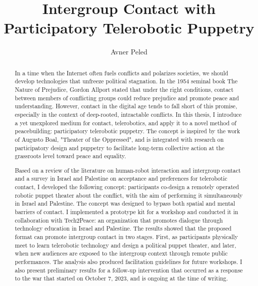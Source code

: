 \documentclass[dissertation,math,vertlayout,pdfa,colorlinks,nologo]{aaltoseries}
\author{Avner Peled}
\title{Intergroup Contact with Participatory Telerobotic Puppetry}
\begin{document}
\draftabstract{
}%


\begin{abstract}
In a time when the Internet often fuels conflicts and polarizes societies, we should develop technologies that unfreeze political stagnation. In the 1954 seminal book The Nature of Prejudice, Gordon Allport stated that under the right conditions, contact between members of conflicting groups could reduce prejudice and promote peace and understanding. However, contact in the digital age tends to fall short of this promise, especially in the context of deep-rooted, intractable conflicts. In this thesis, I introduce a yet unexplored medium for contact, telerobotics, and apply it to a novel method of peacebuilding: participatory telerobotic puppetry. The concept is inspired by the work of Augusto Boal, "Theater of the Oppressed", and is integrated with research on participatory design and puppetry to facilitate long-term collective action at the grassroots level toward peace and equality.

Based on a review of the literature on human-robot interaction and intergroup contact and a survey in Israel and Palestine on acceptance and preferences for telerobotic contact, I developed the following concept: participants co-design a remotely operated robotic puppet theater about the conflict, with the aim of performing it simultaneously in Israel and Palestine. The concept was designed to bypass both spatial and mental barriers of contact. I implemented a prototype kit for a workshop and conducted it in collaboration with Tech2Peace: an organization that promotes dialogue through technology education in Israel and Palestine. The results showed that the proposed format can promote intergroup contact in two stages. First, as participants physically meet to learn telerobotic technology and design a political puppet theater, and later, when new audiences are exposed to the intergroup context through remote public performances. The analysis also produced facilitation guidelines for future workshops. I also present preliminary results for a follow-up intervention that occurred as a response to the war that started on October 7, 2023, and is ongoing at the time of writing.


\end{abstract}
\end{document}
